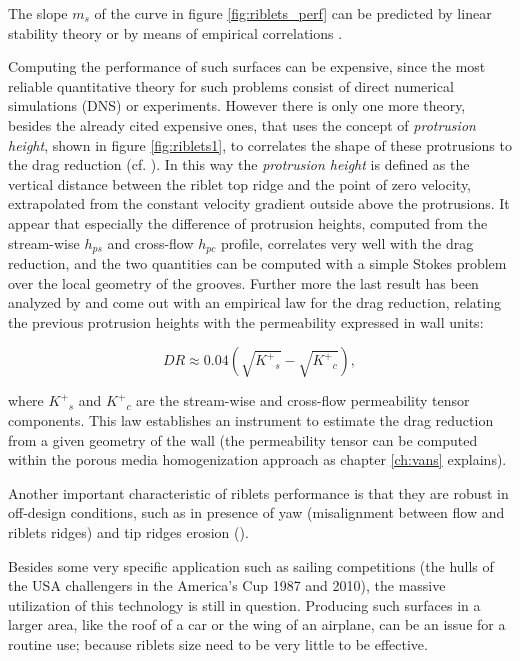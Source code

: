 The slope $m_s$ of the curve in figure \ref{fig:riblets_perf} can be predicted by linear stability theory or by means of empirical correlations \citet{garcia2011hydrodynamic}.

Computing the performance of such surfaces can be expensive, since the most reliable quantitative theory for such problems consist of direct numerical simulations (DNS) or experiments.
However there is only one more theory, besides the already cited expensive ones, that uses the concept of \textit{protrusion height}, shown in figure \ref{fig:riblets1}, to correlates the shape of these protrusions to the drag reduction (cf. \citet{luchini1991resistance}).
In this way the \textit{protrusion height} is defined as the vertical distance between the riblet top ridge and the point of zero velocity, extrapolated from the constant velocity gradient outside above the protrusions.
It appear that especially the difference of protrusion heights, computed from the stream-wise $h_{ps}$ and cross-flow $h_{pc}$ profile, correlates very well with the drag reduction, and the two quantities can be computed with a simple Stokes problem over the local geometry of the grooves.
Further more the last result has been analyzed by \citet{segura2017permeable} and come out with an empirical law for the drag reduction, relating the previous protrusion heights with the permeability expressed in wall units:

\begin{equation}
DR \approx 0.04\left( \sqrt{{K^+}_s} - \sqrt{{K^+}_c} \right),
\label{eq:max_dr}
\end{equation}

where ${K^+}_s$ and ${K^+}_c$ are the stream-wise and cross-flow permeability tensor components.
This law establishes an instrument to estimate the drag reduction from a given geometry of the wall (the permeability tensor can be computed within the porous media homogenization approach as chapter \ref{ch:vans} explains).

Another important characteristic of riblets performance is that they are robust in off-design conditions, such as in presence of yaw (misalignment between flow and riblets ridges) and tip ridges erosion (\citet{garcia2011drag}).

Besides some very specific application such as sailing competitions (the hulls of the USA challengers in the America’s Cup 1987 and 2010), the massive utilization of this technology is still in question.
Producing such surfaces in a larger area, like the roof of a car or the wing of an airplane, can be an issue for a routine use; because riblets size need to be very little to be effective.

